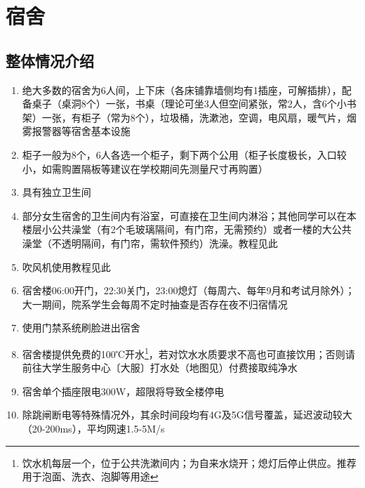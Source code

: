 \chapter[宿舍]{宿舍}
\section[整体情况介绍]{整体情况介绍}
\begin{enumerate}
    \item 绝大多数的宿舍为6人间，上下床（各床铺靠墙侧均有1插座，可解插排），配备桌子（桌洞8个）一张，书桌（理论可坐3人但空间紧张，常2人，含6个小书架）一张，有柜子（常为8个），垃圾桶，洗漱池，空调，电风扇，暖气片，烟雾报警器等宿舍基本设施
    \item 柜子一般为8个，6人各选一个柜子，剩下两个公用（柜子长度极长，入口较小，如需购置隔板等建议在学校期间先测量尺寸再购置）
    \item 具有独立卫生间
    \item 部分女生宿舍的卫生间内有浴室，可直接在卫生间内淋浴；其他同学可以在本楼层小公共澡堂（有2个毛玻璃隔间，有门帘，无需预约）或者一楼的大公共澡堂（不透明隔间，有门帘，需软件预约）洗澡。教程见此
    \item 吹风机使用教程见此
    \item 宿舍楼06:00开门，22:30关门，23:00熄灯（每周六、每年9月和考试月除外）；大一期间，院系学生会每周不定时抽查是否存在夜不归宿情况
    \item 使用门禁系统刷脸进出宿舍
    \item 宿舍楼提供免费的100℃开水\footnote{饮水机每层一个，位于公共洗漱间内；为自来水烧开；熄灯后停止供应。推荐用于泡面、洗衣、泡脚等用途}，若对饮水水质要求不高也可直接饮用；否则请前往大学生服务中心〔大服〕打水处（地图见\dashuline{\ref{map_a}}）付费接取纯净水
    \item 宿舍单个插座限电300W，超限将导致全楼停电
    \item 除跳闸断电等特殊情况外，其余时间段均有4G及5G信号覆盖，延迟波动较大（20-200ms），平均网速1.5-5M/s
\end{enumerate}


